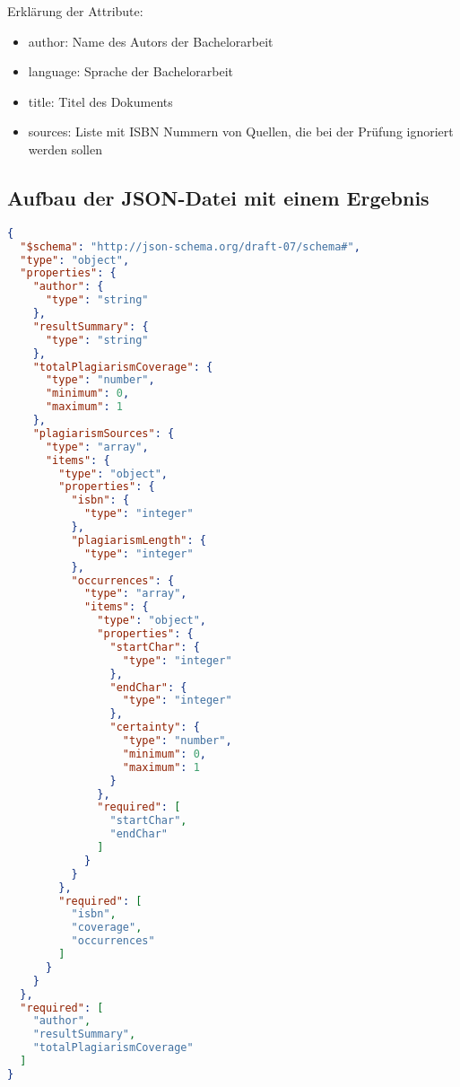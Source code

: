Erklärung der Attribute:
\begin{itemize}
    \item author: Name des Autors der Bachelorarbeit
    \item language: Sprache der Bachelorarbeit
    \item title: Titel des Dokuments
    \item sources: Liste mit ISBN Nummern von Quellen, die bei der Prüfung ignoriert werden sollen
\end{itemize}

\subsection{Aufbau der JSON-Datei mit einem Ergebnis}\label{subsec:json-ergebnis}
\begin{lstlisting}[caption={JSON-Datei mit einem Ergebnis},captionpos=b,label={lst:json-ergebnis}, language=json]
{
  "$schema": "http://json-schema.org/draft-07/schema#",
  "type": "object",
  "properties": {
    "author": {
      "type": "string"
    },
    "resultSummary": {
      "type": "string"
    },
    "totalPlagiarismCoverage": {
      "type": "number",
      "minimum": 0,
      "maximum": 1
    },
    "plagiarismSources": {
      "type": "array",
      "items": {
        "type": "object",
        "properties": {
          "isbn": {
            "type": "integer"
          },
          "plagiarismLength": {
            "type": "integer"
          },
          "occurrences": {
            "type": "array",
            "items": {
              "type": "object",
              "properties": {
                "startChar": {
                  "type": "integer"
                },
                "endChar": {
                  "type": "integer"
                },
                "certainty": {
                  "type": "number",
                  "minimum": 0,
                  "maximum": 1
                }
              },
              "required": [
                "startChar",
                "endChar"
              ]
            }
          }
        },
        "required": [
          "isbn",
          "coverage",
          "occurrences"
        ]
      }
    }
  },
  "required": [
    "author",
    "resultSummary",
    "totalPlagiarismCoverage"
  ]
}
\end{lstlisting}


